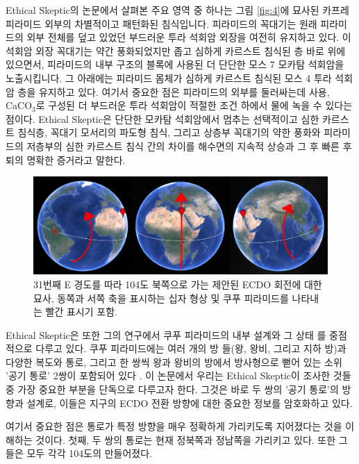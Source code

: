 \documentclass[10pt,twocolumn,letterpaper]{article}
\begin{document}
Ethical Skeptic의 논문에서 살펴본 주요 영역 중 하나는 그림 \ref{fig:4}에 묘사된 카프레 피라미드 외부의 차별적이고 패턴화된 침식입니다. 피라미드의 꼭대기는 원래 피라미드의 외부 전체를 덮고 있었던 부드러운 투라 석회암 외장을 여전히 유지하고 있다. 이 석회암 외장 꼭대기는 약간 풍화되었지만 좁고 심하게 카르스트 침식된 층 바로 위에 있으면서,  피라미드의 내부 구조의 블록에 사용된 더 단단한 모스 7 모카탐 석회암을 노출시킵니다. 그 아래에는 피라미드 몸체가 심하게 카르스트 침식된 모스 4 투라 석회암 층을 유지하고 있다. 여기서 중요한 점은 피라미드의 외부를 둘러싸는데  사용, CaCO$_3$로 구성된 더 부드러운 투라 석회암이 적절한 조건 하에서 물에 녹을 수 있다는 점이다. Ethical Skeptic은 단단한 모카탐 석회암에서 멈추는 선택적이고 심한 카르스트 침식층, 꼭대기 모서리의 파도형 침식, 그리고 상층부 꼭대기의 약한 풍화와 피라미드의 저층부의 심한 카르스트 침식 간의 차이를 해수면의 지속적 상승과 그 후 빠른 후퇴의 명확한 증거라고 말한다\cite{27}.

\begin{figure}[t]
\begin{center}
\includegraphics[width=1\textwidth]{drawing.jpg}
\end{center}
   \caption{31번째 E 경도를 따라 104도 북쪽으로 가는 제안된 ECDO 회전에 대한 묘사, 동쪽과 서쪽 축을 표시하는 십자 형상 및 쿠푸 피라미드를 나타내는 빨간 표시기 포함.}
\label{fig:6}
\end{figure}

Ethical Skeptic은 또한 그의 연구에서 쿠푸 피라미드의 내부 설계와 그 상태 \cite{28}를 중점적으로 다루고 있다. 쿠푸 피라미드에는 여러 개의 방 들(왕, 왕비, 그리고 지하 방)과 다양한 복도와 통로, 그리고 한 쌍씩  왕과 왕비의 방에서 방사형으로 뻗어 있는 소위 '공기 통로' 2쌍이 포함되어 있다 \cite{29,30}. 이 논문에서 우리는 Ethical Skeptic이 조사한 것들 중 가장 중요한 부분을 단독으로 다루고자 한다. 그것은 바로 두 쌍의 '공기 통로'의 방향과 설계로, 이들은 지구의 ECDO 전환 방향에 대한 중요한 정보를 암호화하고 있다.

여기서 중요한 점은 통로가 특정 방향을 매우 정확하게 가리키도록 지어졌다는 것을 이해하는 것이다. 첫째, 두 쌍의 통로는 현재 정북쪽과 정남쪽을 가리키고 있다. 또한 그들은 모두 각각 104도의 만들어졌다.
\end{document}
